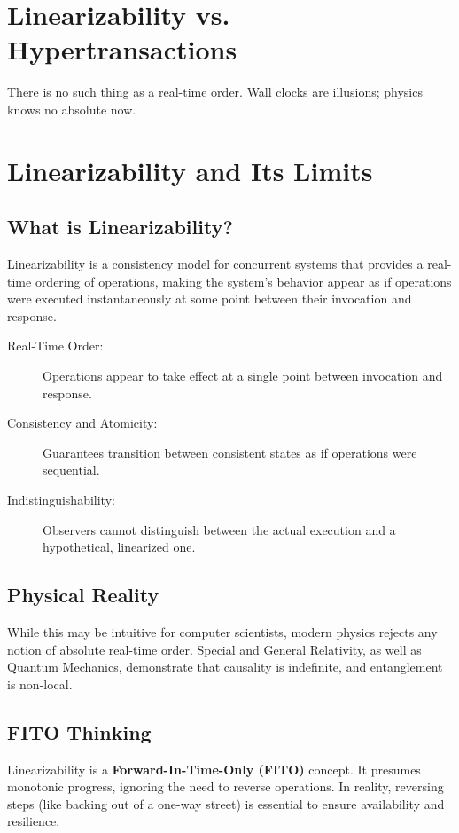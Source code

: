 \documentclass[../../../OAE-SPEC-MAIN.tex]{subfiles}
\begin{document}
\section{Linearizability vs. Hypertransactions}

There is no such thing as a real-time order. Wall clocks are illusions; physics knows no absolute now.

\section{Linearizability and Its Limits}

\subsection{What is Linearizability?}
Linearizability is a consistency model for concurrent systems that provides a real-time ordering of operations, making the system's behavior appear as if operations were executed instantaneously at some point between their invocation and response.

\begin{description}
  \item[Real-Time Order:] Operations appear to take effect at a single point between invocation and response.
  \item[Consistency and Atomicity:] Guarantees transition between consistent states as if operations were sequential.
  \item[Indistinguishability:] Observers cannot distinguish between the actual execution and a hypothetical, linearized one.
\end{description}

\subsection{Physical Reality}
While this may be intuitive for computer scientists, modern physics rejects any notion of absolute real-time order. Special and General Relativity, as well as Quantum Mechanics, demonstrate that causality is indefinite, and entanglement is non-local.

\subsection{FITO Thinking}
Linearizability is a \textbf{Forward-In-Time-Only (FITO)} concept. It presumes monotonic progress, ignoring the need to reverse operations. In reality, reversing steps (like backing out of a one-way street) is essential to ensure availability and resilience.
\end{document}
